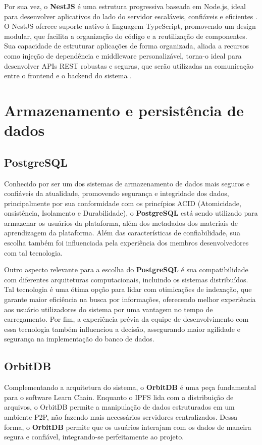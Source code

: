 Por sua vez, o \textbf{NestJS} é uma estrutura progressiva baseada em Node.js, ideal para desenvolver aplicativos do lado do servidor escaláveis, confiáveis e eficientes \cite{nestjs2025}. O NestJS oferece suporte nativo à linguagem TypeScript, promovendo um design modular, que facilita a organização do código e a reutilização de componentes. Sua capacidade de estruturar aplicações de forma organizada, aliada a recursos como injeção de dependência e middleware personalizável, torna-o ideal para desenvolver APIs REST robustas e seguras, que serão utilizadas na comunicação entre o frontend e o backend do sistema \cite{nestjs2025}.

\section{Armazenamento e persistência de dados}

\subsection{PostgreSQL}

Conhecido por ser um dos sistemas de armazenamento de dados mais seguros e confiáveis da atualidade, promovendo segurança e integridade dos dados, principalmente por sua conformidade com os princípios ACID (Atomicidade, onsistência, Isolamento e Durabilidade), o \textbf{PostgreSQL} está sendo utilizado para armazenar os usuários da plataforma, além dos metadados dos materiais de aprendizagem da plataforma. Além das características de confiabilidade, sua escolha também foi influenciada pela experiência dos membros desenvolvedores com tal tecnologia.

Outro aspecto relevante para a escolha do \textbf{PostgreSQL} é sua compatibilidade com diferentes arquiteturas computacionais, incluindo os sistemas distribuídos. Tal tecnologia é uma ótima opção para lidar com otimicações de indexação, que garante maior eficiência na busca por informações, oferecendo melhor experiência aos usuário utilizadores do sistema por uma vantagem no tempo de carregamento. Por fim, a experiência prévia da equipe de desenvolvimento com essa tecnologia também influenciou a decisão, assegurando maior agilidade e segurança na implementação do banco de dados.


\subsection{OrbitDB}

Complementando a arquitetura do sistema, o \textbf{OrbitDB} é uma peça fundamental para o software Learn Chain. Enquanto o IPFS lida com a distribuição de arquivos, o OrbitDB permite a manipulação de dados estruturados em um ambiente P2P, não fazendo mais necessários servidores centralizados. Dessa forma, o \textbf{OrbitDB} permite que os usuários interajam com os dados de maneira segura e confiável, integrando-se perfeitamente ao projeto.

